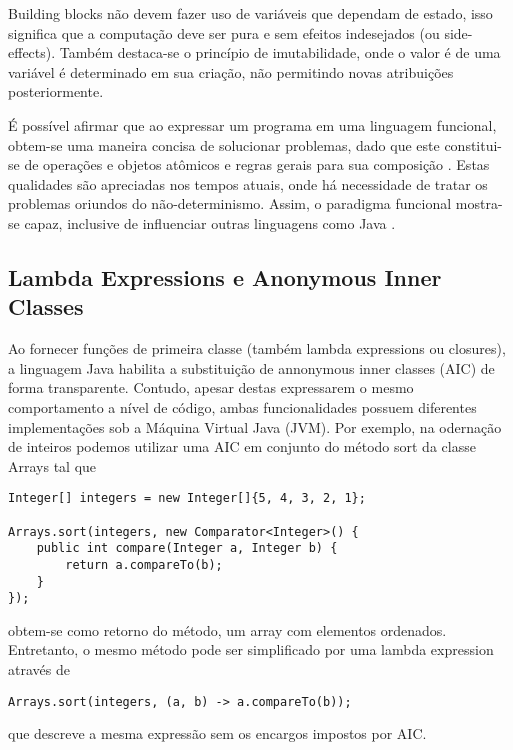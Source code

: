 \documentclass[10pt, conference]{IEEEtran}
\begin{document}
Building blocks não devem fazer uso de variáveis que dependam de estado, isso significa que a computação deve ser pura e sem efeitos indesejados (ou side-effects). Também destaca-se o princípio de imutabilidade, onde o valor é de uma variável é determinado em sua criação, não permitindo novas atribuições posteriormente.

É possível afirmar que ao expressar um programa em uma linguagem funcional, obtem-se uma maneira concisa de solucionar problemas, dado que este constitui-se de operações e objetos atômicos e regras gerais para sua composição \cite{michaelson2011introduction}. Estas qualidades são apreciadas nos tempos atuais, onde há necessidade de tratar os problemas oriundos do não-determinismo. Assim, o paradigma funcional mostra-se capaz, inclusive de influenciar outras linguagens como Java \cite{jsr335}.

\subsection{Lambda Expressions e Anonymous Inner Classes}
Ao fornecer funções de primeira classe (também lambda expressions ou closures), a linguagem Java habilita a substituição de annonymous inner classes (AIC) de forma transparente. Contudo, apesar destas expressarem o mesmo comportamento a nível de código, ambas funcionalidades possuem diferentes implementações sob a Máquina Virtual Java (JVM). Por exemplo, na odernação de inteiros podemos utilizar uma AIC em conjunto do método sort da classe Arrays tal que

\begin{lstlisting}[caption={Sort - Anonymous Inner Class}, label={lst:array-aic-sort}]
Integer[] integers = new Integer[]{5, 4, 3, 2, 1};

Arrays.sort(integers, new Comparator<Integer>() {
    public int compare(Integer a, Integer b) {
        return a.compareTo(b);
    }
});
\end{lstlisting}

obtem-se como retorno do método, um array com elementos ordenados. Entretanto, o mesmo método pode ser simplificado por uma lambda expression através de

\begin{lstlisting}[caption={Lambda Expressions}]
Arrays.sort(integers, (a, b) -> a.compareTo(b));
\end{lstlisting}

que descreve a mesma expressão sem os encargos impostos por AIC.
\end{document}
